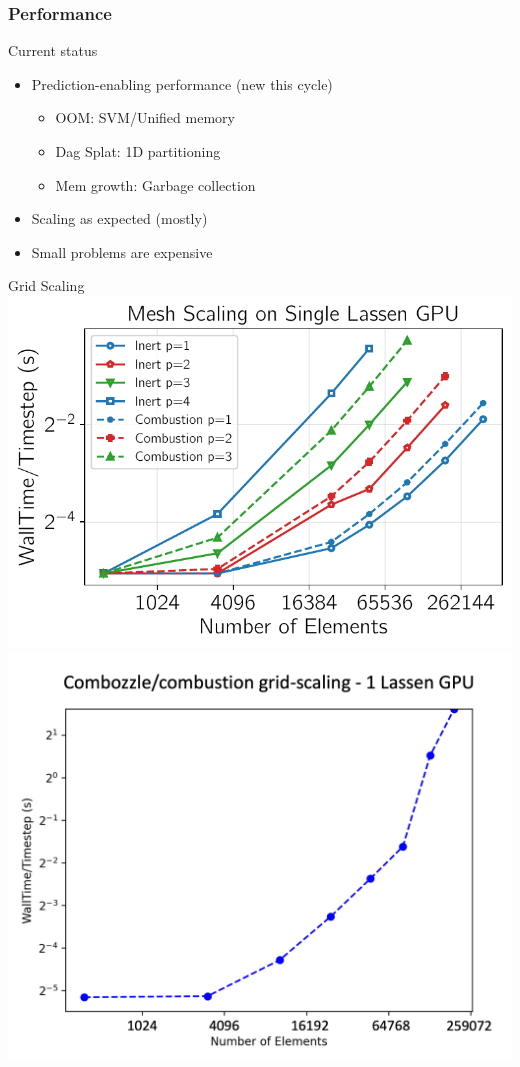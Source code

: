 \begin{frame}\frametitle{Performance}
\begin{center}
Current status
\end{center}
\begin{multicols}{2}
\begin{itemize}
\item Prediction-enabling performance (new this cycle)
\begin{itemize}
\item OOM: SVM/Unified memory
\item Dag Splat: 1D partitioning
\item Mem growth: Garbage collection
\end{itemize}
\item Scaling as expected (mostly)
\item Small problems are expensive
\end{itemize}
\end{multicols}
\begin{center}
Grid Scaling\\
\includegraphics[width=.48\textwidth]{figures/mtc2/combozzle_gridscale.pdf}
\includegraphics[width=.48\textwidth]{figures/comboz_gridscale_svm.png}
\end{center}
\end{frame}

